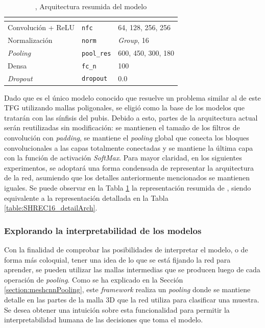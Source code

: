 \begin{table}[h]
\centering
\begin{tabular}{|ll|l|}
\hline
\rowcolor[HTML]{FFC702}
\multicolumn{2}{|c|}{\cellcolor[HTML]{FFC702}{Capa}} & \multicolumn{1}{c|}{\cellcolor[HTML]{FFC702}{Cantidad y/o densidad}} \\ \hline
Convolución + ReLU & \lstinline!nfc! & 64, 128, 256, 256 \\ \hline
Normalización & \lstinline!norm! & \textit{Group}, 16 \\ \hline
\textit{Pooling} & \lstinline!pool_res! & 600, 450, 300, 180 \\ \hline
Densa & \lstinline!fc_n! & 100 \\ \hline
\textit{Dropout} & \lstinline!dropout! & 0.0 \\ \hline
\end{tabular}
\caption[SHREC16: Arquitectura resumida]{, Arquitectura resumida del modelo}
\label{table:SHREC16_condensedArch}
\end{table}

Dado que  es el único modelo conocido que resuelve un problema similar al de este TFG utilizando mallas poligonales, se eligió como la base de los modelos que tratarán con las sínfisis del pubis. Debido a esto, partes de la arquitectura actual serán reutilizadas sin modificación: se mantienen el tamaño de los filtros de convolución con \textit{padding}, se mantiene el \textit{pooling} global que conecta los bloques convolucionales a las capas totalmente conectadas y se mantiene la última capa con la función de activación \textit{SoftMax}. Para mayor claridad, en los siguientes experimentos, se adoptará una forma condensada de representar la arquitectura de la red, asumiendo que los detalles anteriormente mencionados se mantienen iguales. Se puede observar en la Tabla \ref{table:SHREC16_condensedArch} la representación resumida de , siendo equivalente a la representación detallada en la Tabla \ref{table:SHREC16_detailArch}.


\subsubsection{Explorando la interpretabilidad de los modelos}
Con la finalidad de comprobar las posibilidades de interpretar el modelo, o de forma más coloquial, tener una idea de lo que se está fijando la red para aprender, se pueden utilizar las mallas intermedias que se producen luego de cada operación de \textit{pooling}. Como se ha explicado en la Sección \ref{section:meshcnnPooling}, este \textit{framework} realiza un \textit{pooling}  donde se mantiene detalle en las partes de la malla 3D que la red utiliza para clasificar una muestra. Se desea obtener una intuición sobre esta funcionalidad para permitir la interpretabilidad humana de las decisiones que toma el modelo.

